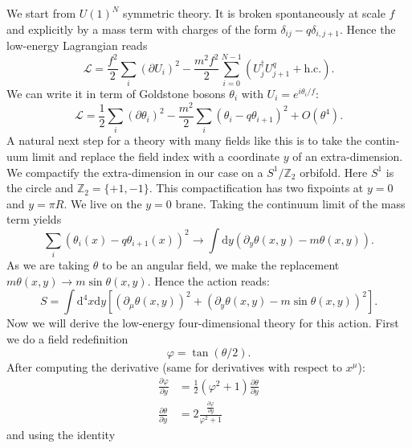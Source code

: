 \documentclass[master,       %
               twoside,        %
               BCOR10mm,       %
               english,ngerman, %
               ]{GAUBM}
\begin{document}
\begin{otherlanguage}{english}
We start from $U(1)^N$ symmetric theory. It is broken spontaneously at scale $f$ and explicitly by a mass term with charges of the form $\delta_{ij} - q \delta_{i,j+1}$. Hence the low-energy Lagrangian reads
\begin{equation}
	\mathcal{L} = \frac{f^2}{2} \sum_i (\partial U_i)^2 - \frac{m^2 f^2}{2} \sum_{i = 0}^{N - 1} (U_j^\dagger U^q_{j + 1} + \mathrm{h.c.}).
\end{equation}
We can write it in term of Goldstone bosons $\theta_i$ with $U_i = e^{i \theta_i/ f}$:
\begin{equation}
	\mathcal{L} = \frac{1}{2} \sum_i (\partial \theta_i)^2 - \frac{m^2}{2} \sum_i (\theta_i - q \theta_{i + 1})^2 + O(\theta^4).
\end{equation}
A natural next step for a theory with many fields like this is to take the continuum limit and replace the field index with a coordinate $y$ of an extra-dimension.
We compactify the extra-dimension in our case on a $S^1 / \mathbb{Z}_2$ orbifold. Here $S^1$ is the circle and $\mathbb{Z}_2 = \{+1, -1\}$. This compactification has two fixpoints at $y = 0$ and $y = \pi R$. We live on the $y = 0$ brane.
Taking the continuum limit of the mass term yields
\begin{equation}
	\sum_i (\theta_i(x) - q \theta_{i + 1}(x))^2 \to \int \mathrm{d} y (\partial_y \theta(x, y) - m \theta(x, y) ).
\end{equation}
As we are taking $\theta$ to be an angular field, we make the replacement $m \theta(x, y) \to m \sin \theta(x, y)$.
Hence the action reads:
\begin{equation}
	S = \int \mathrm{d}^4 x \mathrm{d} y \left[ (\partial_\mu \theta(x, y))^2 + (\partial_y \theta(x, y) - m \sin \theta(x, y))^2 \right].
\end{equation}
Now we will derive the low-energy four-dimensional theory for this action.
First we do a field redefinition
\begin{equation}
	\varphi = \tan ( \theta / 2 ).
\end{equation}
After computing the derivative (same for derivatives with respect to $x^\mu$):
\begin{align}
	\frac{\partial \varphi}{\partial y} &= \frac{1}{2} (\varphi^2 + 1) \frac{\partial \theta}{\partial y} \nonumber \\
	\frac{\partial \theta}{\partial y} &= 2 \frac{\frac{\partial \varphi}{\partial y}}{\varphi^2 + 1} 
\end{align}
and using the identity
\begin{equation}

\end{equation}
\end{otherlanguage}
\end{document}
